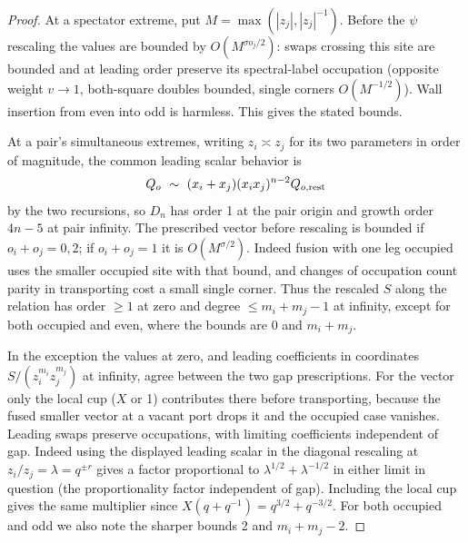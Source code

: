 \documentclass[11pt]{article}
\numberwithin{equation}{section}
\theoremstyle{definition}\newtheorem{definition}[theorem]{Definition}
\theoremstyle{remark}\newtheorem{remark}[theorem]{Remark}
\begin{document}
\begin{proof}
At a spectator extreme, put \(M=\max(|z_j|,|z_j|^{-1})\). Before the \(\psi\) rescaling the values are bounded by \(O(M^{\sigma o_j/2})\): swaps crossing this site are bounded and at leading order preserve its spectral-label occupation (opposite weight \(v\to1\), both-square doubles bounded, single corners \(O(M^{-1/2})\)). Wall insertion from even into odd is harmless. This gives the stated bounds.

At a pair's simultaneous extremes, writing \(z_i\asymp z_j\) for its two parameters in order of magnitude, the common leading scalar behavior is
\[
 Q_o\ \sim\ (x_i+x_j)(x_i x_j)^{n-2} Q_{o,{\rm rest}}
\]
by the two recursions, so \(D_n\) has order 1 at the pair origin and growth order \(4n-5\) at pair infinity. The prescribed vector before rescaling is bounded if \(o_i+o_j=0,2\); if \(o_i+o_j=1\) it is \(O(M^{\sigma/2})\). Indeed fusion with one leg occupied uses the smaller occupied site with that bound, and changes of occupation count parity in transporting cost a small single corner. Thus the rescaled \(S\) along the relation has order \(\ge1\) at zero and degree \(\le m_i+m_j-1\) at infinity, except for both occupied and even, where the bounds are 0 and \(m_i+m_j\). 

In the exception the values at zero, and leading coefficients in coordinates \(S/(z_i^{m_i}z_j^{m_j})\) at infinity, agree between the two gap prescriptions. For the vector only the local cup (\(X\) or 1) contributes there before transporting, because the fused smaller vector at a vacant port drops it and the occupied case vanishes. Leading swaps preserve occupations, with limiting coefficients independent of gap. Indeed using the displayed leading scalar in the diagonal rescaling at \(z_i/z_j=\lambda=q^{\pm r}\) gives a factor proportional to \(\lambda^{1/2}+\lambda^{-1/2}\) in either limit in question (the proportionality factor independent of gap). Including the local cup gives the same multiplier since \(X(q+q^{-1})=q^{3/2}+q^{-3/2}\). For both occupied and odd we also note the sharper bounds 2 and \(m_i+m_j-2\).


\end{proof}
\end{document}
